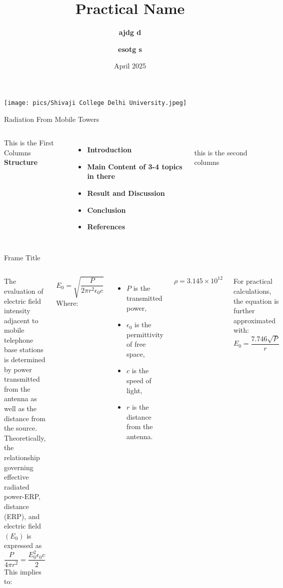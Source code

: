 \documentclass[7pt, aspectratio=169]{beamer}
\title{Practical Name}
\author{\textbf{ajdg d} \inst{1} \and \textbf{esotg s} \inst{2}}
\date{April 2025}
\institute{
\inst{1} Department of physics
}
\begin{document}
    \begin{frame}
    \titlepage
    \begin{center}
        \texttt{[image: pics/Shivaji College Delhi University.jpeg]}
    \end{center}
    \end{frame}

\begin{frame}{Radiation From Mobile Towers}
    \begin{columns}
         This is the First Columns\\
        \textbf{Structure}\\
        \begin{itemize}
            \item \textbf{Introduction}
            \item \textbf{Main Content of 3-4 topics in there}
            \item \textbf{Result and Discussion}
            \item \textbf{Conclusion}
            \item \textbf{References}
        \end{itemize}\\
        \vspace{0.1cm}
         this is the second columns\\
    \end{columns}
\end{frame}


\begin{frame}{Frame Title}
    \begin{columns}
     The evaluation of electric field intensity adjacent to mobile telephone base stations is determined by power transmitted from the antenna as well as the distance from the source. Theoretically, the relationship governing effective radiated power-ERP, distance (ERP), and electric field \((E_0)\) is expressed as \cite{roe2012probability}
    \[
        \frac{P}{4 \pi r^2} = \frac{E_0^2 \epsilon_0 c}{2}
    \]
        This implies to:

    \[
        E_0 = \sqrt{\frac{P}{2 \pi r^2 \epsilon_0 c}}
    \]
    Where:
    \begin{itemize}
        \item \(P\) is the transmitted power, \cite{roe2012probability}
        \item \( \epsilon_0 \) is the permittivity of free space,
        \item \(c\) is the speed of light,
        \item \(r\) is the distance from the antenna.
    \end{itemize}

    \[\rho = 3.145 \times 10^{12}\]

    For practical calculations, the equation is further approximated with:
    \[
        E_0 = \frac{7.746 \sqrt{P}}{r}
    \]
    \end{columns}

\end{frame}
\end{document}
